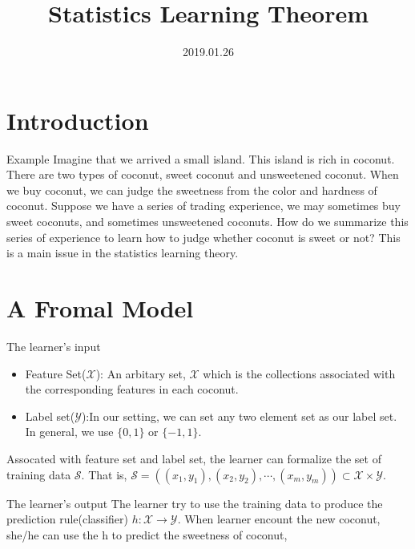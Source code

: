 \documentclass{beamer}
\title[Introduction]{Statistics Learning Theorem}
\author{}
\institute{}
\date{2019.01.26}
\begin{document}
\begin{frame}
  \titlepage
\end{frame}


\section{Introduction}

\begin{frame}{Example}
	Imagine that we arrived a small island. This island is rich in coconut. There are two types of coconut, sweet coconut and unsweetened coconut. When we buy coconut, we can judge the sweetness from the color and hardness of coconut. Suppose we have a series of trading experience, we may sometimes buy sweet coconuts, and sometimes unsweetened coconuts. How do we summarize this series of experience to learn how to judge whether coconut is sweet or not? This is a main issue in the statistics learning theory. 

\end{frame}

\section{A Fromal Model}

\begin{frame}{The learner's input}
	\begin{itemize}
		\item Feature Set($\mathcal{X}$): An arbitary set, $\mathcal{X}$ which is the collections associated with the corresponding features in each coconut.
		\item Label set($\mathcal{Y}$):In our setting, we can set any two element set as our label set. In general, we use $\{0,1\}$ or $\{-1,1\}$. 
	\end{itemize}
	Assocated with feature set and label set, the learner can formalize the set of training data $\mathcal{S}$. That is, $\mathcal{S} = ( (x_1,y_1),(x_2,y_2), \cdots , (x_m,y_m) ) \subset \mathcal{X} \times \mathcal{Y}$. 
\end{frame}

\begin{frame}{The learner's output}
	The learner try to use the training data to produce the prediction rule(classifier) $h: \mathcal{X} \rightarrow \mathcal{Y}$. When learner encount the new coconut, she/he can use the h to predict the sweetness of coconut,
\end{frame}
\end{document}
